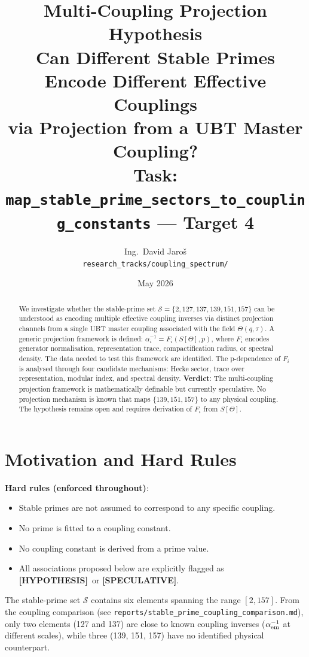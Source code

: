 \documentclass[12pt,a4paper]{article}
\title{\textbf{Multi-Coupling Projection Hypothesis}\\[4pt]
       \large Can Different Stable Primes Encode Different Effective Couplings\\
       via Projection from a UBT Master Coupling?\\[2pt]
       \normalsize Task: \texttt{map\_stable\_prime\_sectors\_to\_coupling\_constants} — Target 4}
\author{Ing.\ David Jaro\v{s}\\
  \small \texttt{research\_tracks/coupling\_spectrum/}}
\date{May 2026}
\theoremstyle{definition}
\theoremstyle{remark}
\newcommand{\hyp}{\textcolor{orange!75!black}{\textbf{[HYPOTHESIS]}}}
\newcommand{\spec}{\textcolor{purple!60!black}{\textbf{[SPECULATIVE]}}}
\begin{document}
\maketitle

\begin{abstract}
We investigate whether the stable-prime set
$\mathcal{S} = \{2, 127, 137, 139, 151, 157\}$ can be understood as encoding
multiple effective coupling inverses via distinct projection channels from a
single UBT master coupling associated with the field $\Theta(q, \tau)$.
A generic projection framework is defined: $\alpha_i^{-1} = F_i(S[\Theta], p)$,
where $F_i$ encodes generator normalisation, representation trace, compactification
radius, or spectral density.  The data needed to test this framework are
identified.  The p-dependence of $F_i$ is analysed through four candidate
mechanisms: Hecke sector, trace over representation, modular index, and
spectral density.
\textbf{Verdict}: The multi-coupling projection framework is mathematically
definable but currently speculative.  No projection mechanism is known that
maps $\{139, 151, 157\}$ to any physical coupling.  The hypothesis remains
open and requires derivation of $F_i$ from $S[\Theta]$.
\end{abstract}

\tableofcontents
\clearpage

\section{Motivation and Hard Rules}

\begin{warnbox}
\textbf{Hard rules (enforced throughout)}:
\begin{itemize}
\item Stable primes are not assumed to correspond to any specific coupling.
\item No prime is fitted to a coupling constant.
\item No coupling constant is derived from a prime value.
\item All associations proposed below are explicitly flagged as
      \hyp\ or \spec.
\end{itemize}
\end{warnbox}

The stable-prime set $\mathcal{S}$ contains six elements spanning the range
$[2, 157]$.  From the coupling comparison
(see \texttt{reports/stable\_prime\_coupling\_comparison.md}), only two elements
(127 and 137) are close to known coupling inverses ($\alpha_{\rm em}^{-1}$
at different scales), while three (139, 151, 157) have no identified physical
counterpart.
\end{document}
